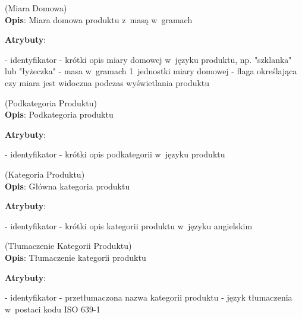 \begin{enumerate}[label={\textbf{KAT/2/\protect\twodigits{\theenumi}}}, wide, labelwidth=!, labelindent=0pt, labelsep=0pt, series=reqs]
    \label{kat:HouseholdMeasure} (Miara Domowa)\\
    \indent\textbf{Opis}: Miara domowa produktu z~masą w~gramach
    \par
    \textbf{Atrybuty}:
    \begin{itemize}[series=atr, wide, align=left, leftmargin=190pt]
        \label{kat:HouseholdMeasure:id}- identyfikator
        \label{kat:HouseholdMeasure:description}- krótki opis miary domowej w~języku produktu, np. "szklanka" lub "łyżeczka"
        \label{kat:HouseholdMeasure:gramsWeight}- masa w~gramach 1~jednostki miary domowej
        \label{kat:HouseholdMeasure:isVisible}- flaga określająca czy miara jest widoczna podczas wyświetlania produktu
    \end{itemize}

    \label{kat:ProductSubcategory} (Podkategoria Produktu)\\
    \indent\textbf{Opis}: Podkategoria produktu
    \par
    \textbf{Atrybuty}:
    \begin{itemize}[series=atr, wide, align=left, leftmargin=190pt]
        \label{kat:ProductSubcategory:id}- identyfikator
        \label{kat:ProductSubcategory:description}- krótki opis podkategorii w~języku produktu
    \end{itemize}

    \label{kat:ProductCategory} (Kategoria Produktu)\\
    \indent\textbf{Opis}: Główna kategoria produktu
    \par
    \textbf{Atrybuty}:
    \begin{itemize}[series=atr, wide, align=left, leftmargin=190pt]
        \label{kat:ProductCategory:id}- identyfikator
        \label{kat:ProductCategory:description}- krótki opis kategorii produktu w~języku angielskim
    \end{itemize}

    \label{kat:ProductCategoryTranslation} (Tłumaczenie Kategorii Produktu)\\
    \indent\textbf{Opis}: Tłumaczenie kategorii produktu
    \par
    \textbf{Atrybuty}:
    \begin{itemize}[series=atr, wide, align=left, leftmargin=190pt]
        \label{kat:ProductCategoryTranslation:id}- identyfikator
        \label{kat:ProductCategoryTranslation:translation}- przetłumaczona nazwa kategorii produktu
        \label{kat:ProductCategoryTranslation:language}- język tłumaczenia w~postaci kodu ISO 639-1
    \end{itemize}


\end{enumerate}
